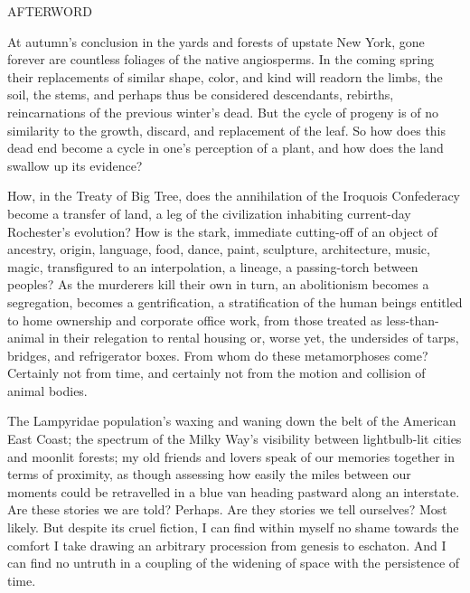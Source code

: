 \documentclass[12pt]{article}
\begin{document}
\vspace*{8\baselineskip}

\begingroup
\begin{center}
\huge AFTERWORD
\end{center}
\endgroup

\begingroup
\hspace{5mm} At autumn's conclusion in the yards and forests of upstate New York, gone forever are countless foliages of the native angiosperms. In the coming spring their replacements of similar shape, color, and kind will readorn the limbs, the soil, the stems, and perhaps thus be considered descendants, rebirths, reincarnations of the previous winter's dead. But the cycle of progeny is of no similarity to the growth, discard, and replacement of the leaf. So how does this dead end become a cycle in one's perception of a plant, and how does the land swallow up its evidence? \\
\endgroup

\begingroup
\hspace{5mm} How, in the Treaty of Big Tree, does the annihilation of the Iroquois Confederacy become a transfer of land, a leg of the civilization inhabiting current-day Rochester's evolution? How is the stark, immediate cutting-off of an object of ancestry, origin, language, food, dance, paint, sculpture, architecture, music, magic, transfigured to an interpolation, a lineage, a passing-torch between peoples? As the murderers kill their own in turn, an abolitionism becomes a segregation, becomes a gentrification, a stratification of the human beings entitled to home ownership and corporate office work, from those treated as less-than-animal in their relegation to rental housing or, worse yet, the undersides of tarps, bridges, and refrigerator boxes. From whom do these metamorphoses come? Certainly not from time, and certainly not from the motion and collision of animal bodies. \\
\endgroup

\begingroup
\hspace{5mm} The Lampyridae population's waxing and waning down the belt of the American East Coast; the spectrum of the Milky Way's visibility between lightbulb-lit cities and moonlit forests; my old friends and lovers speak of our memories together in terms of proximity, as though assessing how easily the miles between our moments could be retravelled in a blue van heading pastward along an interstate. Are these stories we are told? Perhaps. Are they stories we tell ourselves? Most likely. But despite its cruel fiction, I can find within myself no shame towards the comfort I take drawing an arbitrary procession from genesis to eschaton. And I can find no untruth in a coupling of the widening of space with the persistence of time. \\
\endgroup
\end{document}
